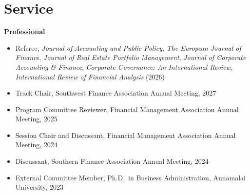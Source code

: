 \documentclass[letterpaper,11pt]{article}
\begin{document}
\section{\textbf{Service}}
\vspace{1mm}

\small{\textbf{Professional}}
\vspace{-1mm}
\begin{itemize}[leftmargin=*, labelsep=1mm, itemsep=0.5mm]
    \small
    \item Referee, \textit{Journal of Accounting and Public Policy}, \textit{The European Journal of Finance}, \textit{Journal of Real Estate Portfolio Management}, \textit{Journal of Corporate Accounting \& Finance}, \textit{Corporate Governance: An International Review}, \textit{International Review of Financial Analysis} (2026)
    \item Track Chair, Southwest Finance Association Annual Meeting, 2027
    \item Program Committee Reviewer, Financial Management Association Annual Meeting, 2025
    \item Session Chair and Discussant, Financial Management Association Annual Meeting, 2024
    \item Discussant, Southern Finance Association Annual Meeting, 2024
    \item External Committee Member, Ph.D.\ in Business Administration, Annamalai University, 2023
\end{itemize}
\end{document}
